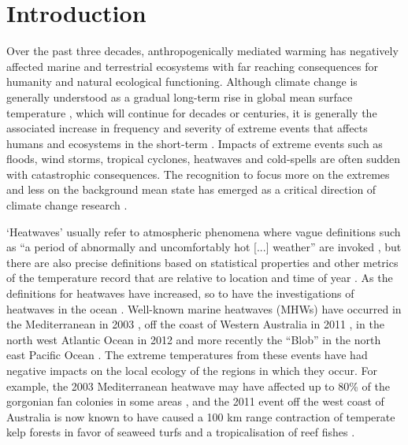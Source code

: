 \documentclass[a4paper,10pt,review]{elsarticle}
\begin{document}
\section{Introduction}
Over the past three decades, anthropogenically mediated warming has negatively affected marine and terrestrial ecosystems with far reaching consequences for humanity and natural ecological functioning. Although climate change is generally understood as a gradual long-term rise in global mean surface temperature \citep{IPCC2014}, which will continue for decades or centuries, it is generally the associated increase in frequency and severity of extreme events that affects humans and ecosystems in the short-term \citep{Easterling2000}. Impacts of extreme events such as floods, wind storms, tropical cyclones, heatwaves and cold-spells are often sudden with catastrophic consequences. The recognition to focus more on the extremes and less on the background mean state has emerged as a critical direction of climate change research \citep{Jentsch2007}.

`Heatwaves' usually refer to atmospheric phenomena where vague definitions such as ``a period of abnormally and uncomfortably hot [...] weather'' are invoked \citep{Glickman2000}, but there are also precise definitions based on statistical properties and other metrics of the temperature record that are relative to location and time of year \citep[e.g.][]{Meehl2004, Alexander2006, Fischer2010, Fischer2011, Perkins2013}. As the definitions for heatwaves have increased, so to have the investigations of heatwaves in the ocean \citep[e.g.][]{Mackenzie2007, Selig2010, Sura2011, Lima2012, DeCastro2014}. Well-known marine heatwaves (MHWs) have occurred in the Mediterranean in 2003 \citep{Black2004, Olita2007, Garrabou2009}, off the coast of Western Australia in 2011 \citep{Feng2013, Pearce2013, Wernberg2013}, in the north west Atlantic Ocean in 2012 \citep{Mills2012, Chen2014, Chen2015} and more recently the ``Blob'' in the north east Pacific Ocean \citep{Bond2015}. The extreme temperatures from these events have had negative impacts on the local ecology of the regions in which they occur. For example, the 2003 Mediterranean heatwave may have affected up to 80\% of the gorgonian fan colonies in some areas \citep{Garrabou2009}, and the 2011 event off the west coast of Australia is now known to have caused a 100 km range contraction of temperate kelp forests in favor of seaweed turfs and a tropicalisation of reef fishes \citep{Wernberg2016}.
\end{document}
